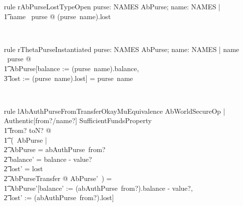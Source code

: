 \begin{LRRT}
\begin{theorem}{rule rAbPurseLostTypeOpen}
   \forall purse: NAMES \ffun AbPurse; name: NAMES | \\
      \t1 name \in \dom~purse @ (purse~name).lost \in \nat
\end{theorem}~\end{LRRT}

\begin{LRRT}
\begin{theorem}{rule rThetaPurseInstantiated}
  \forall purse: NAMES \ffun AbPurse; name: NAMES | name \in  \dom~purse @ \\
      \t1 \theta AbPurse[balance := (purse~name).balance, \\
            \t3 lost := (purse~name).lost] = purse~name
\end{theorem}~\end{LRRT}

\begin{LRRT}
\begin{theorem}{rule lAbAuthPurseFromTransferOkayMuEquivalence}
    \forall  AbWorldSecureOp | Authentic[from?/name?] \land  SufficientFundsProperty \\
        \t1 \land from? \neq toN? @ \\
        \t1\ (~\mu \Delta AbPurse | \\
            \t2 \theta  AbPurse = abAuthPurse~from? \land  \\
            \t2 balance' = balance - value? \land  \\
            \t2 lost' = lost \land  \\
            \t2 \Xi AbPurseTransfer @ \theta  AbPurse'~) = \\
        \t1 \theta AbPurse'[balance' := (abAuthPurse~from?).balance - value?, \\
            \t2 lost' := (abAuthPurse~from?).lost]
\end{theorem}~\end{LRRT}

